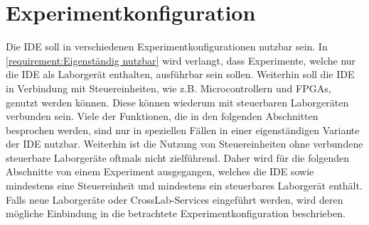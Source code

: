 \section{Experimentkonfiguration}\label{section:konzeption:experimentkonfiguration}

Die IDE soll in verschiedenen Experimentkonfigurationen nutzbar sein. In \autoref{requirement:Eigenständig nutzbar} wird verlangt, dass Experimente, welche nur die IDE als Laborgerät enthalten, ausführbar sein sollen. Weiterhin soll die IDE in Verbindung mit Steuereinheiten, wie z.B. Microcontrollern und FPGAs, genutzt werden können. Diese können wiederum mit steuerbaren Laborgeräten verbunden sein. Viele der Funktionen, die in den folgenden Abschnitten besprochen werden, sind nur in speziellen Fällen in einer eigenständigen Variante der IDE nutzbar. Weiterhin ist die Nutzung von Steuereinheiten ohne verbundene steuerbare Laborgeräte oftmals nicht zielführend. Daher wird für die folgenden Abschnitte von einem Experiment ausgegangen, welches die IDE sowie mindestens eine Steuereinheit und mindestens ein steuerbares Laborgerät enthält. Falls neue Laborgeräte oder CrossLab-Services eingeführt werden, wird deren mögliche Einbindung in die betrachtete Experimentkonfiguration beschrieben.